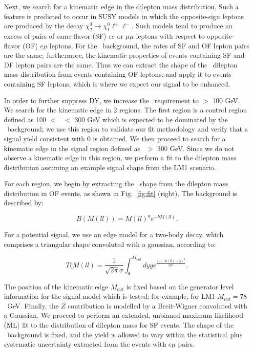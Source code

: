 Next, we search for a kinematic edge in the dilepton mass distribution. Such a feature is 
predicted to occur in SUSY models in which the opposite-sign leptons are produced by the
decay $\chi_2^0 \to \chi_1^0 \ell^+\ell^-$. Such models tend to produce an excess of pairs 
of same-flavor (SF) $ee$ or $\mu\mu$ leptons with respect to opposite-flavor (OF) $e\mu$
leptons. For the \ttbar\ background, the rates of SF and OF lepton pairs are the same;
furthermore, the kinematic properties of events containing SF and DF lepton pairs are the
same. Thus we can extract the shape of the \ttbar\ dilepton mass distribution from events 
containing OF leptons, and apply it to events containing SF leptons, which is where we expect 
our signal to be enhanced.

In order to further suppress DY, we increase the \MET\ requirement to \MET $>$ 100 GeV. 
We search for the kinematic edge in 2 regions.  The first region is a control region defined
as 100 $<$ \Ht\ $<$ 300 GeV which is expected to be dominated by the \ttbar\ background; we use 
this region to validate our fit methodology and verify that a signal yield consistent with 0 
is obtained. We then proceed to search for a kinematic edge in the signal region defined as 
\Ht\ $>$ 300 GeV. Since we do not observe a kinematic edge in this region, we perform a 
fit to the dilepton mass distribution assuming an example signal shape from the LM1 scenario.

For each region, we begin by extracting the \ttbar\ shape from the dilepton mass distribution 
in OF events, as shown in Fig.~\ref{fig:fit} (right). The background is described by:

\begin{equation}
B(M(ll)) = M(ll)^a e^{-b M(ll)}.
\end{equation}

For a potential signal, we use an edge model for a two-body decay, which comprises a triangular shape convoluted with a gaussian,
according to:

\begin{equation}
T(M(ll) = \frac{1}{\sqrt{2\pi}\sigma}\int_0^{M_{cut}} dy y e^{\frac{(-(M(ll)-y)^2}{2\sigma^2}}. 
\end{equation}

The position of the kinematic edge $M_{cut}$ is fixed based on the generator level
information for the signal model which is tested; for example, for LM1 
$M_{cut} = 78$~GeV. Finally, the $Z$ contribution is modelled by a Breit-Wigner 
convoluted with a Gaussian. We proceed to perform an extended, unbinned maximum 
likelihood (ML) fit to the distribution of dilepton mass for SF events. The shape of 
the \ttbar\ background is fixed, and the yield is allowed to vary within the 
statistical plus systematic uncertainty extracted from the events with $e\mu$ pairs. 

